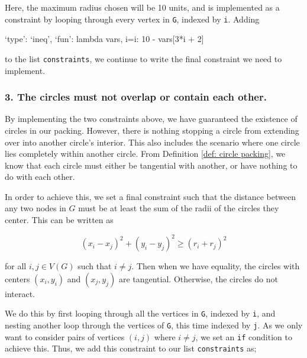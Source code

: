 \begin{flushleft}
Here, the maximum radius chosen will be 10 units, and is implemented as a constraint by looping through every vertex in \texttt{G}, indexed by \texttt{i}. Adding
\end{flushleft}

\begin{code}
    {`type': `ineq', `fun': lambda vars, i=i: 10 - vars[3*i + 2]}
\end{code}

\begin{flushleft}
to the list \texttt{constraints}, we continue to write the final constraint we need to implement.
\end{flushleft}

\subsubsection{3. The circles must not overlap or contain each other.}

\begin{flushleft}
By implementing the two constraints above, we have guaranteed the existence of circles in our packing. However, there is nothing stopping a circle from extending over into another circle's interior. This also includes the scenario where one circle lies completely within another circle. From Definition \ref{def: circle packing}, we know that each circle must either be tangential with another, or have nothing to do with each other.
\end{flushleft}

\begin{flushleft}
In order to achieve this, we set a final constraint such that the distance between any two nodes in $G$ must be at least the sum of the radii of the circles they center. This can be written as

\[
(x_i - x_j)^2 + (y_i - y_j)^2 \geq (r_i + r_j)^2
\]

\vspace{2mm}
for all $i,j \in V(G)$ such that $i \neq j$. Then when we have equality, the circles with centers $(x_i, y_i)$ and $(x_j, y_j)$ are tangential. Otherwise, the circles do not interact.
\end{flushleft}

\begin{flushleft}
We do this by first looping through all the vertices in \texttt{G}, indexed by \texttt{i}, and nesting another loop through the vertices of \texttt{G}, this time indexed by \texttt{j}. As we only want to consider pairs of vertices $(i,j)$ where $i \neq j$, we set an \texttt{if} condition to achieve this. Thus, we add this constraint to our list \texttt{constraints} as;
\end{flushleft}

